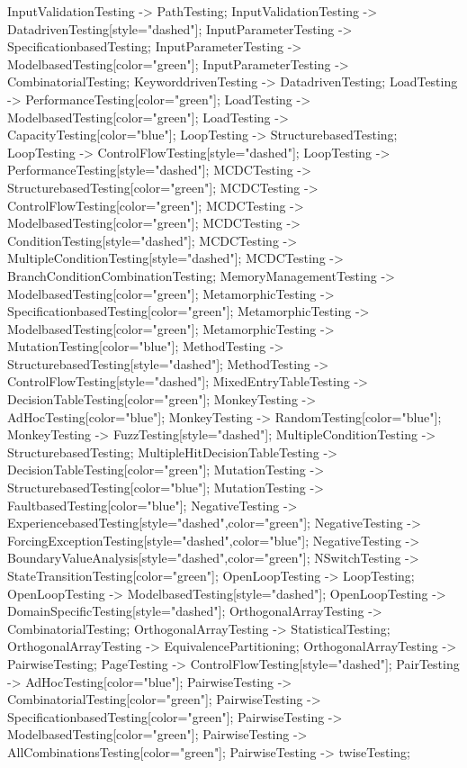 \documentclass{article}
\begin{document}
{InputValidationTesting -> PathTesting;
InputValidationTesting -> DatadrivenTesting[style="dashed"];
InputParameterTesting -> SpecificationbasedTesting;
InputParameterTesting -> ModelbasedTesting[color="green"];
InputParameterTesting -> CombinatorialTesting;
KeyworddrivenTesting -> DatadrivenTesting;
LoadTesting -> PerformanceTesting[color="green"];
LoadTesting -> ModelbasedTesting[color="green"];
LoadTesting -> CapacityTesting[color="blue"];
LoopTesting -> StructurebasedTesting;
LoopTesting -> ControlFlowTesting[style="dashed"];
LoopTesting -> PerformanceTesting[style="dashed"];
MCDCTesting -> StructurebasedTesting[color="green"];
MCDCTesting -> ControlFlowTesting[color="green"];
MCDCTesting -> ModelbasedTesting[color="green"];
MCDCTesting -> ConditionTesting[style="dashed"];
MCDCTesting -> MultipleConditionTesting[style="dashed"];
MCDCTesting -> BranchConditionCombinationTesting;
MemoryManagementTesting -> ModelbasedTesting[color="green"];
MetamorphicTesting -> SpecificationbasedTesting[color="green"];
MetamorphicTesting -> ModelbasedTesting[color="green"];
MetamorphicTesting -> MutationTesting[color="blue"];
MethodTesting -> StructurebasedTesting[style="dashed"];
MethodTesting -> ControlFlowTesting[style="dashed"];
MixedEntryTableTesting -> DecisionTableTesting[color="green"];
MonkeyTesting -> AdHocTesting[color="blue"];
MonkeyTesting -> RandomTesting[color="blue"];
MonkeyTesting -> FuzzTesting[style="dashed"];
MultipleConditionTesting -> StructurebasedTesting;
MultipleHitDecisionTableTesting -> DecisionTableTesting[color="green"];
MutationTesting -> StructurebasedTesting[color="blue"];
MutationTesting -> FaultbasedTesting[color="blue"];
NegativeTesting -> ExperiencebasedTesting[style="dashed",color="green"];
NegativeTesting -> ForcingExceptionTesting[style="dashed",color="blue"];
NegativeTesting -> BoundaryValueAnalysis[style="dashed",color="green"];
NSwitchTesting -> StateTransitionTesting[color="green"];
OpenLoopTesting -> LoopTesting;
OpenLoopTesting -> ModelbasedTesting[style="dashed"];
OpenLoopTesting -> DomainSpecificTesting[style="dashed"];
OrthogonalArrayTesting -> CombinatorialTesting;
OrthogonalArrayTesting -> StatisticalTesting;
OrthogonalArrayTesting -> EquivalencePartitioning;
OrthogonalArrayTesting -> PairwiseTesting;
PageTesting -> ControlFlowTesting[style="dashed"];
PairTesting -> AdHocTesting[color="blue"];
PairwiseTesting -> CombinatorialTesting[color="green"];
PairwiseTesting -> SpecificationbasedTesting[color="green"];
PairwiseTesting -> ModelbasedTesting[color="green"];
PairwiseTesting -> AllCombinationsTesting[color="green"];
PairwiseTesting -> twiseTesting;
}
\end{document}
